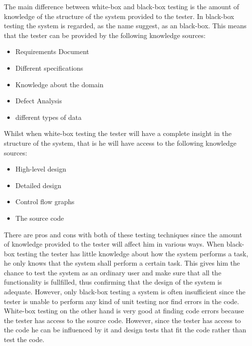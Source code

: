 The main difference between white-box and black-box testing is the amount of knowledge of the structure of the system provided to the tester. In black-box testing the system is regarded, as the name suggest, as an black-box. This means that the tester can be provided by the following knowledge sources:
\begin{itemize}
	\item Requirements Document
	\item Different specifications
	\item Knowledge about the domain
	\item Defect Analysis
	\item different types of data
\end{itemize}

\noindent Whilst when white-box testing the tester will have a complete insight in the structure of the system, that is he will have access to the following knowledge sources:
\begin{itemize}
	\item High-level design
	\item Detailed design
	\item Control flow graphs
	\item The source code
\end{itemize}

\noindent There are pros and cons with both of these testing techniques since the amount of knowledge provided to the tester will affect him in various ways. When black-box testing the tester has little knowledge about how the system performs a task,  he only knows that the system shall perform a certain task. This gives him the chance to test the system as an ordinary user and make sure that all the functionality is fullfilled, thus confirming that the design of the system is adequate. However, only black-box testing a system is often insufficient since the tester is unable to perform any kind of unit testing nor find errors in the code.
White-box testing on the other hand is very good at finding code errors because the tester has access to the source code. However, since the tester has access to the code he can be influenced by it and design tests that fit the code rather than test the code.